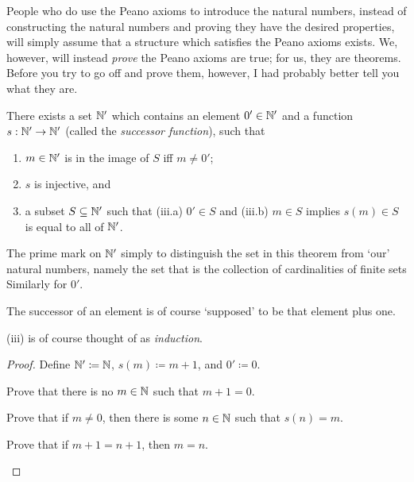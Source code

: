 People who do use the Peano axioms to introduce the natural numbers, instead of constructing the natural numbers and proving they have the desired properties, will simply assume that a structure which satisfies the Peano axioms exists.  We, however, will instead \emph{prove} the Peano axioms are true; for us, they are theorems.  Before you try to go off and prove them, however, I had probably better tell you what they are.
\begin{thm}
There exists a set $\mathbb{N} '$ which contains an element $0'\in \mathbb{N}'$ and a function $s:\mathbb{N} '\rightarrow \mathbb{N} '$ (called the \emph{successor function}), such that
\begin{enumerate}
\item \label{enm1.1.23.i}$m\in \mathbb{N} '$ is in the image of $S$ iff $m\neq 0'$;
\item \label{enm1.1.23.ii}$s$ is injective, and
\item \label{enm1.1.23.iii} a subset $S\subseteq \mathbb{N} '$ such that (iii.a) $0'\in S$ and (iii.b) $m\in S$ implies $s(m)\in S$ is equal to all of $\mathbb{N} '$.
\end{enumerate}
\begin{rmk}
The prime mark on $\mathbb{N} '$ simply to distinguish the set in this theorem from `our' natural numbers, namely the set that is the collection of cardinalities of finite sets  Similarly for $0'$.
\end{rmk}
\begin{rmk}
The successor of an element is of course `supposed' to be that element plus one.
\end{rmk}
\begin{rmk}
(iii) is of course thought of as \emph{induction}.
\end{rmk}
\begin{proof}
Define $\mathbb{N} '\coloneqq \mathbb{N}$, $s(m)\coloneqq m+1$, and $0'\coloneqq 0$.

\begin{exr}
Prove that there is no $m\in \mathbb{N}$ such that $m+1=0$.
\end{exr}
\begin{exr}
Prove that if $m\neq 0$, then there is some $n\in \mathbb{N}$ such that $s(n)=m$.
\end{exr}

\begin{exr}
Prove that if $m+1=n+1$, then $m=n$.
\end{exr}


\end{proof}
\end{thm}
